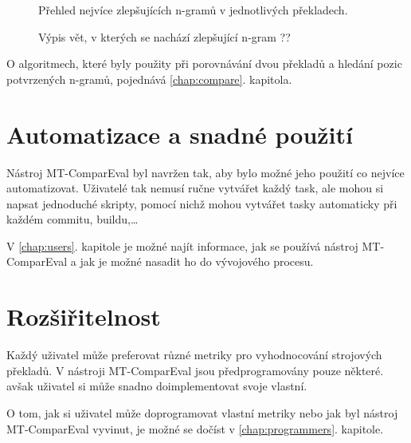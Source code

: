\begin{figure}
	\caption{Přehled nejvíce zlepšujících n-gramů v jednotlivých překladech.}
	\label{img:confirmed_ngrams}
\end{figure}

\begin{figure}
	\caption{Výpis vět, v kterých se nachází zlepšující n-gram ??}
	\label{img:filtered_sentences}
\end{figure}

O algoritmech,
  které byly použity při porovnávání dvou překladů a hledání pozic potvrzených n-gramů,
  pojednává \ref{chap:compare}. kapitola.


\section{Automatizace a snadné použití}
Nástroj MT-ComparEval byl navržen tak,
  aby bylo možné jeho použití co nejvíce automatizovat.
Uživatelé tak nemusí ručne vytvářet každý task,
  ale mohou si napsat jednoduché skripty,
  pomocí nichž mohou vytvářet tasky automaticky při každém commitu, buildu,\dots

V \ref{chap:users}. kapitole je možné najít informace,
  jak se používá nástroj MT-ComparEval
  a jak je možné nasadit ho do vývojového procesu.

\section{Rozšiřitelnost}
Každý uživatel může preferovat různé metriky pro vyhodnocování strojových překladů.
V nástroji MT-ComparEval jsou předprogramovány pouze některé.
  avšak uživatel si může snadno doimplementovat svoje vlastní.

O tom, jak si uživatel může doprogramovat vlastní metriky nebo jak byl nástroj MT-ComparEval vyvinut,
  je možné se dočíst v \ref{chap:programmers}. kapitole.

